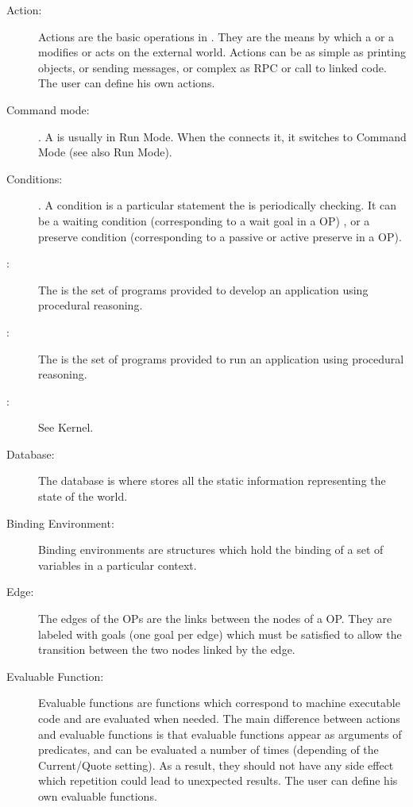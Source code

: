 \begin{description}

\item[Action:] Actions are the basic operations in \OPRS{}. They are the means
by which a \CPK{} or a \XPK{} modifies or acts on the external world. Actions
can be as simple as printing objects, or sending messages, or complex as RPC or
call to linked code. The user can define his own actions.

\item[Command mode:]. A \CPK{} is usually in Run Mode. When the \OPRSS{}
connects it, it switches to Command Mode (see also Run Mode).

\item[Conditions:]. A condition is a particular statement the \CPK{} is
  periodically checking. It can be a waiting condition (corresponding to a wait
  goal in a OP) , or a preserve condition (corresponding to a passive or active
  preserve in a OP).

\item[\COPRSDE{}:] The \COPRSDE{} is the set of programs provided to
develop an application using procedural reasoning.

\item[\COPRSAE{}:] The \COPRSAE{} is the set of programs provided to
run an application using procedural reasoning.

\item[\CPK{}:] See Kernel.

\item[Database:] The database is where \OPRS{} stores all the static information
representing the state of the world.

\item[Binding Environment:] Binding environments are \OPRS{} structures which
hold the binding of a set of variables in a particular context.

\item[Edge:] The edges of the OPs are the links between the nodes of a OP. They
are labeled with goals (one goal per edge) which must be satisfied to allow
the transition between the two nodes linked by the edge.

\item[Evaluable Function:] Evaluable functions are functions which correspond
to machine executable code and are evaluated when needed. The main difference
between actions and evaluable functions is that evaluable functions appear as
arguments of predicates, and can be evaluated a number of times (depending of
the Current/Quote setting). As a result, they should not have any side effect
which repetition could lead to unexpected results. The user can define his own
evaluable functions.


\end{description}
